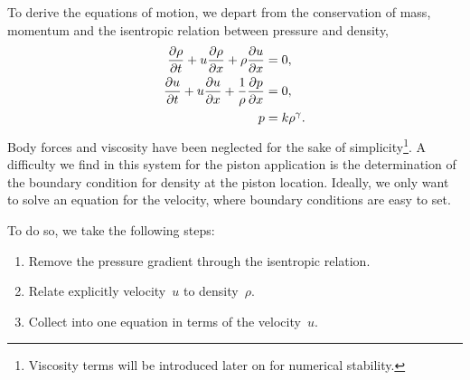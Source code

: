 \documentclass[../../thesis.tex]{subfiles}
\begin{document}
To derive the equations of motion, 
we depart from the conservation of mass, momentum and the isentropic relation between pressure and density,
\begin{subequations}
\begin{align}
    \pdv{\rho}{t} + u \pdv{\rho}{x} + \rho \pdv{u}{x} &= 0, \\ 
    \pdv{u}{t} + u \pdv{u}{x} + \frac{1}{\rho}\pdv{p}{x} &= 0, \\
    p &= k \rho^{\gamma} \label{eq:isentropic_relation}. 
\end{align}
\end{subequations}
Body forces and viscosity have been neglected for the sake of simplicity\footnote{Viscosity terms will be introduced later on for numerical stability.}.
A difficulty we find in this system for the piston application is the determination of the boundary condition for density at the piston location.
Ideally, we only want to solve an equation for the velocity, where boundary conditions are easy to set.

To do so, we take the following steps:
\begin{enumerate}
    \item Remove the pressure gradient through the isentropic relation. 
    \item Relate explicitly velocity~$u$ to density~$\rho$. %
    \item Collect into one equation in terms of the velocity~$u$.
\end{enumerate}
\end{document}
